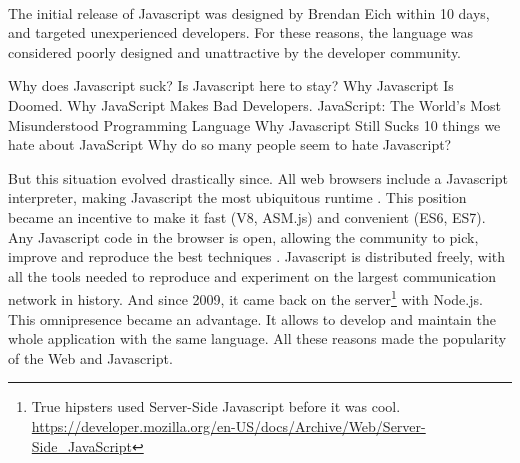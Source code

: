\paragraph{}

The initial release of Javascript was designed by Brendan Eich within 10 days, and targeted unexperienced developers.
For these reasons, the language was considered poorly designed and unattractive by the developer community.

{
\fontsize{10pt}{10pt}\selectfont
Why does Javascript suck?
Is Javascript here to stay?
Why Javascript Is Doomed.
Why JavaScript Makes Bad Developers.
JavaScript: The World's Most Misunderstood Programming Language
Why Javascript Still Sucks
10 things we hate about JavaScript
Why do so many people seem to hate Javascript?
}

But this situation evolved drastically since.
All web browsers include a Javascript interpreter, making Javascript the most ubiquitous runtime \cite{Flanagan2006}.
This position became an incentive to make it fast (V8, ASM.js) and convenient (ES6, ES7).
Any Javascript code in the browser is open, allowing the community to pick, improve and reproduce the best techniques .
Javascript is distributed freely, with all the tools needed to reproduce and experiment on the largest communication network in history.
And since 2009, it came back on the server\footnote{True hipsters used Server-Side Javascript before it was cool. \url{https://developer.mozilla.org/en-US/docs/Archive/Web/Server-Side_JavaScript}} with Node.js.
This omnipresence became an advantage.
It allows to develop and maintain the whole application with the same language.
All these reasons made the popularity of the Web and Javascript.



